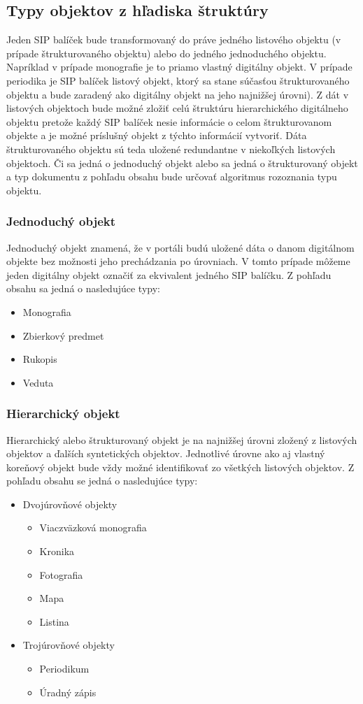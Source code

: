\documentclass[
  print, %
  table,   %
  lof,     %
  nolot,     %
]{fithesis3}
\begin{document}
\subsection{Typy objektov z hľadiska štruktúry}
Jeden SIP balíček bude transformovaný do práve jedného listového objektu (v prípade štrukturovaného objektu) alebo do jedného jednoduchého objektu. Napríklad v prípade monografie je to priamo vlastný digitálny objekt. V prípade periodika je SIP balíček listový objekt, ktorý sa stane súčasťou štrukturovaného objektu a bude zaradený ako digitálny objekt na jeho najnižšej úrovni).
Z dát v listových objektoch bude možné zložiť celú štruktúru hierarchického digitálneho objektu pretože každý SIP balíček nesie informácie o celom štrukturovanom objekte a je možné príslušný objekt z týchto informácií vytvoriť. Dáta štrukturovaného objektu sú teda uložené redundantne v niekoľkých listových objektoch.
Či sa jedná o jednoduchý objekt alebo sa jedná o štrukturovaný objekt a typ dokumentu z pohľadu obsahu bude určovať algoritmus rozoznania typu objektu. 
\subsubsection{Jednoduchý objekt}
Jednoduchý objekt znamená, že v portáli budú uložené dáta o danom digitálnom objekte bez možnosti jeho prechádzania po úrovniach. V tomto prípade môžeme jeden digitálny objekt označiť za ekvivalent jedného SIP balíčku.
Z pohľadu obsahu sa jedná o nasledujúce typy:
\begin{itemize}
	\item Monografia
	\item Zbierkový predmet
	\item Rukopis
	\item Veduta
\end{itemize}
\subsubsection{Hierarchický objekt}
Hierarchický alebo štrukturovaný objekt je na najnižšej úrovni zložený z listových objektov a ďalších syntetických objektov. Jednotlivé úrovne ako aj vlastný koreňový objekt bude vždy možné identifikovať zo všetkých listových objektov. Z pohľadu obsahu se jedná o nasledujúce typy:
\begin{itemize}
\item Dvojúrovňové objekty
	\begin{itemize}
	\item Viaczväzková monografia
	\item Kronika
	\item Fotografia	
	\item Mapa
	\item Listina
	\end{itemize}
\item Trojúrovňové objekty
	\begin{itemize}
	\item Periodikum
	\item Úradný zápis	
	\end{itemize}
\end{itemize}
\end{document}
